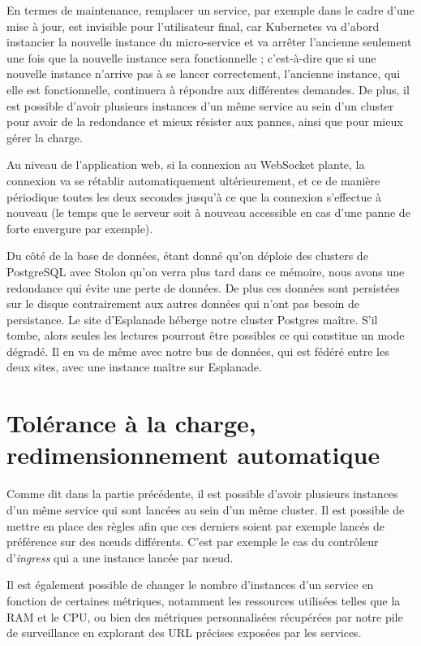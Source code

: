 En termes de maintenance, remplacer un service, par exemple dans le
cadre d'une mise à jour, est invisible pour l'utilisateur final, car
Kubernetes va d'abord instancier la nouvelle instance du micro-service
et va arrêter l'ancienne seulement une fois que la nouvelle instance
sera fonctionnelle ; c'est-à-dire que si une nouvelle instance n'arrive
pas à se lancer correctement, l'ancienne instance, qui elle est
fonctionnelle, continuera à répondre aux différentes demandes. De plus,
il est possible d'avoir plusieurs instances d'un même service au sein
d'un cluster pour avoir de la redondance et mieux résister aux pannes,
ainsi que pour mieux gérer la charge.

Au niveau de l'application web, si la connexion au WebSocket plante, la
connexion va se rétablir automatiquement ultérieurement, et ce de
manière périodique toutes les deux secondes jusqu'à ce que la connexion
s'effectue à nouveau (le temps que le serveur soit à nouveau accessible
en cas d'une panne de forte envergure par exemple).

Du côté de la base de données, étant donné qu'on déploie des clusters
de PostgreSQL avec Stolon qu'on verra plus tard dans ce mémoire, nous
avons une redondance qui évite une perte de données. De plus ces données
sont persistées sur le disque contrairement aux autres données qui n'ont
pas besoin de persistance. Le site d'Esplanade héberge notre cluster
Postgres maître. S'il tombe, alors seules les lectures pourront être
possibles ce qui constitue un mode dégradé. Il en va de même avec notre
bus de données, qui est fédéré entre les deux sites, avec une instance
maître sur Esplanade.

\section{Tolérance à la charge, redimensionnement automatique}

Comme dit dans la partie précédente, il est possible d'avoir plusieurs
instances d'un même service qui sont lancées au sein d'un même cluster.
Il est possible de mettre en place des règles afin que ces derniers
soient par exemple lancés de préférence sur des nœuds différents. C'est
par exemple le cas du contrôleur d'\textit{ingress} qui a une instance
lancée par nœud.

Il est également possible de changer le nombre d'instances d'un service
en fonction de certaines métriques, notamment les ressources utilisées
telles que la RAM et le CPU, ou bien des métriques personnalisées
récupérées par notre pile de surveillance en explorant des URL précises
exposées par les services.

